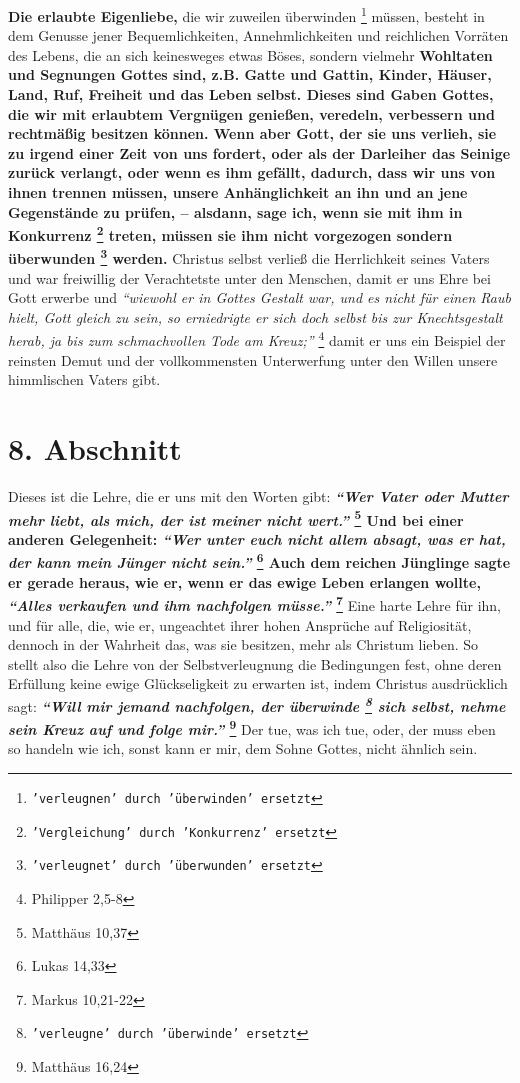 \label{ref:04_07_vorteile}
\textbf{Die erlaubte Eigenliebe,} die wir zuweilen überwinden
\footnote{\texttt{'verleugnen' durch 'überwinden' ersetzt}} müssen, besteht in dem
Genusse jener Bequemlichkeiten, Annehmlichkeiten und reichlichen Vorräten des
Lebens, die an sich keinesweges etwas Böses, sondern vielmehr \textbf{Wohltaten
und
Segnungen Gottes sind, z.B. Gatte und Gattin, Kinder, Häuser, Land, Ruf,
Freiheit und das Leben selbst. Dieses sind Gaben Gottes, die wir mit erlaubtem
Vergnügen genießen, veredeln, verbessern und rechtmäßig besitzen können. Wenn
aber Gott, der sie uns verlieh, sie zu irgend einer Zeit von uns fordert, oder
als der Darleiher das Seinige zurück verlangt, oder wenn es ihm gefällt,
dadurch, dass wir uns von ihnen trennen müssen, unsere Anhänglichkeit an ihn und
an jene Gegenstände zu prüfen, -- alsdann, sage ich, wenn sie mit ihm in
Konkurrenz \footnote{\texttt{'Vergleichung' durch 'Konkurrenz' ersetzt}} treten, müssen
sie ihm nicht vorgezogen sondern überwunden \footnote{\texttt{'verleugnet' durch
'überwunden' ersetzt}} werden.}
Christus selbst verließ die Herrlichkeit seines Vaters und war freiwillig der
Verachtetste unter den Menschen, damit er uns Ehre bei Gott erwerbe und
\textit{"`wiewohl er in Gottes Gestalt war, und es nicht für einen Raub hielt,
Gott
gleich zu sein, so erniedrigte er sich doch selbst bis zur Knechtsgestalt
herab, ja bis zum schmachvollen Tode am Kreuz;"'}
\footnote{Philipper 2,5-8}
damit er
uns ein Beispiel der reinsten Demut und der vollkommensten Unterwerfung unter
den Willen unsere himmlischen Vaters gibt.

\section{8. Abschnitt} \label{kap4_ab8}

Dieses ist die Lehre, die er uns mit den Worten gibt:
\textbf{
\textit{"`Wer Vater oder Mutter mehr liebt, als mich, der ist meiner nicht
wert."'}
\footnote{Matthäus  10,37}
Und bei einer anderen Gelegenheit:
\textit{"`Wer unter euch nicht allem absagt, was er hat, der kann mein Jünger
nicht sein."'}
\footnote{Lukas 14,33} Auch dem reichen
Jünglinge sagte er gerade heraus, wie er, wenn er das ewige Leben erlangen
wollte,
\textit{"`Alles verkaufen und ihm nachfolgen müsse."'}
\footnote{Markus 10,21-22}
}
Eine harte Lehre für ihn, und für alle, die, wie er, ungeachtet ihrer hohen
Ansprüche auf Religiosität, dennoch in der Wahrheit das, was sie besitzen, mehr
als Christum lieben. So stellt also die Lehre von der Selbstverleugnung die
Bedingungen fest, ohne deren Erfüllung keine ewige Glückseligkeit zu erwarten
ist, indem Christus ausdrücklich sagt:
\textbf{
\textit{"`Will mir jemand nachfolgen, der überwinde \footnote{\texttt{'verleugne'
durch 'überwinde' ersetzt}} sich selbst, nehme sein Kreuz auf und folge
mir."'}
\footnote{Matthäus 16,24}}
Der tue, was ich tue, oder, der muss eben so handeln wie ich, sonst kann
er mir, dem Sohne Gottes, nicht ähnlich sein.


